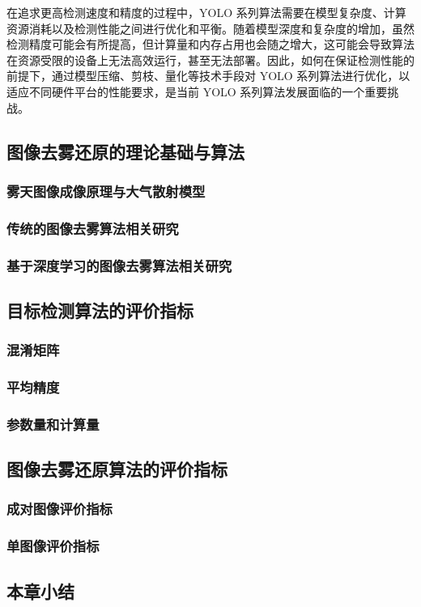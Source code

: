 在追求更高检测速度和精度的过程中，YOLO 系列算法需要在模型复杂度、计算资源消耗以及检测性能之间进行优化和平衡。随着模型深度和复杂度的增加，虽然检测精度可能会有所提高，但计算量和内存占用也会随之增大，这可能会导致算法在资源受限的设备上无法高效运行，甚至无法部署。因此，如何在保证检测性能的前提下，通过模型压缩、剪枝、量化等技术手段对 YOLO 系列算法进行优化，以适应不同硬件平台的性能要求，是当前 YOLO 系列算法发展面临的一个重要挑战。


\subsection{图像去雾还原的理论基础与算法}



\subsubsection{雾天图像成像原理与大气散射模型}



\subsubsection{传统的图像去雾算法相关研究}

\subsubsection{基于深度学习的图像去雾算法相关研究}



\subsection{目标检测算法的评价指标}

\subsubsection{混淆矩阵}

\subsubsection{平均精度}

\subsubsection{参数量和计算量}


\subsection{图像去雾还原算法的评价指标}

\subsubsection{成对图像评价指标}

\subsubsection{单图像评价指标}


\subsection{本章小结}





